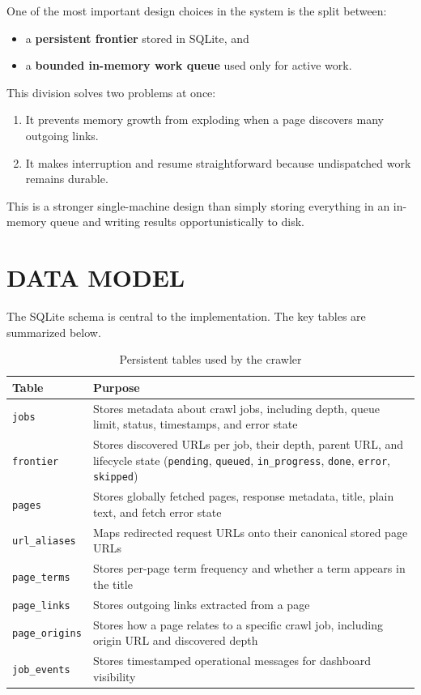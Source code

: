 \documentclass[pdftex,12pt,a4paper]{article}
\begin{document}
One of the most important design choices in the system is the split between:

\begin{itemize}
    \item a \textbf{persistent frontier} stored in SQLite, and
    \item a \textbf{bounded in-memory work queue} used only for active work.
\end{itemize}

This division solves two problems at once:

\begin{enumerate}
    \item It prevents memory growth from exploding when a page discovers many outgoing links.
    \item It makes interruption and resume straightforward because undispatched work remains durable.
\end{enumerate}

This is a stronger single-machine design than simply storing everything in an in-memory queue and writing results opportunistically to disk.

\section{DATA MODEL}
\label{sec:data_model}

The SQLite schema is central to the implementation. The key tables are summarized below.

\begin{table}[H]
\centering
\caption{Persistent tables used by the crawler}
\begin{tabular}{|p{3.3cm}|p{9.7cm}|}
\hline
\textbf{Table} & \textbf{Purpose} \\
\hline
\texttt{jobs} & Stores metadata about crawl jobs, including depth, queue limit, status, timestamps, and error state \\
\hline
\texttt{frontier} & Stores discovered URLs per job, their depth, parent URL, and lifecycle state (\texttt{pending}, \texttt{queued}, \texttt{in\_progress}, \texttt{done}, \texttt{error}, \texttt{skipped}) \\
\hline
\texttt{pages} & Stores globally fetched pages, response metadata, title, plain text, and fetch error state \\
\hline
\texttt{url\_aliases} & Maps redirected request URLs onto their canonical stored page URLs \\
\hline
\texttt{page\_terms} & Stores per-page term frequency and whether a term appears in the title \\
\hline
\texttt{page\_links} & Stores outgoing links extracted from a page \\
\hline
\texttt{page\_origins} & Stores how a page relates to a specific crawl job, including origin URL and discovered depth \\
\hline
\texttt{job\_events} & Stores timestamped operational messages for dashboard visibility \\
\hline
\end{tabular}
\label{tab:schema}
\end{table}
\end{document}
